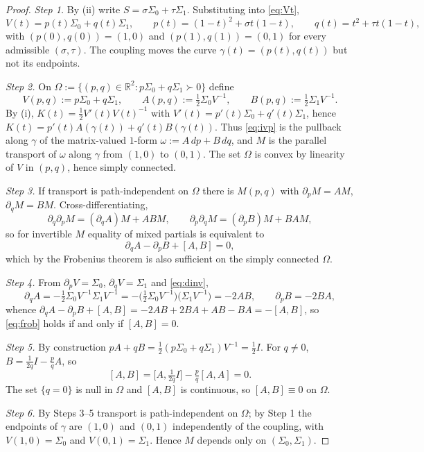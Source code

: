 \documentclass[11pt]{article}
\theoremstyle{definition}
\theoremstyle{remark}
\newcommand{\R}{\mathbb{R}}
\begin{document}
\begin{proof}
\emph{Step 1.} By (ii) write $S=\sigma\Sigma_0+\tau\Sigma_1$. Substituting into \eqref{eq:Vt},
\[
V(t)=p(t)\Sigma_0+q(t)\Sigma_1,
\qquad
p(t)=(1-t)^{2}+\sigma t(1-t),
\qquad
q(t)=t^{2}+\tau t(1-t),
\]
with $(p(0),q(0))=(1,0)$ and $(p(1),q(1))=(0,1)$ for every admissible $(\sigma,\tau)$. The coupling
moves the curve $\gamma(t)=(p(t),q(t))$ but not its endpoints.

\emph{Step 2.} On $\Omega:=\{(p,q)\in\R^{2}:p\Sigma_0+q\Sigma_1\succ0\}$ define
\[
V(p,q):=p\Sigma_0+q\Sigma_1,
\qquad
A(p,q):=\tfrac12\Sigma_0V^{-1},
\qquad
B(p,q):=\tfrac12\Sigma_1V^{-1}.
\]
By (i), $K(t)=\tfrac12V'(t)V(t)^{-1}$ with $V'(t)=p'(t)\Sigma_0+q'(t)\Sigma_1$, hence
$K(t)=p'(t)A(\gamma(t))+q'(t)B(\gamma(t))$. Thus \eqref{eq:ivp} is the pullback along $\gamma$ of
the matrix-valued $1$-form $\omega:=A\,dp+B\,dq$, and $M$ is the parallel transport of $\omega$
along $\gamma$ from $(1,0)$ to $(0,1)$. The set $\Omega$ is convex by linearity of $V$ in $(p,q)$,
hence simply connected.

\emph{Step 3.} If transport is path-independent on $\Omega$ there is $M(p,q)$ with
$\partial_pM=AM$, $\partial_qM=BM$. Cross-differentiating,
\[
\partial_q\partial_pM=(\partial_qA)M+ABM,
\qquad
\partial_p\partial_qM=(\partial_pB)M+BAM,
\]
so for invertible $M$ equality of mixed partials is equivalent to
\begin{equation}\label{eq:frob}
\partial_qA-\partial_pB+[A,B]=0,
\end{equation}
which by the Frobenius theorem is also sufficient on the simply connected $\Omega$.

\emph{Step 4.} From $\partial_pV=\Sigma_0$, $\partial_qV=\Sigma_1$ and \eqref{eq:dinv},
\[
\partial_qA=-\tfrac12\Sigma_0V^{-1}\Sigma_1V^{-1}=-\big(\tfrac12\Sigma_0V^{-1}\big)\big(\Sigma_1V^{-1}\big)=-2AB,
\qquad
\partial_pB=-2BA,
\]
whence $\partial_qA-\partial_pB+[A,B]=-2AB+2BA+AB-BA=-[A,B]$, so \eqref{eq:frob} holds if and only
if $[A,B]=0$.

\emph{Step 5.} By construction $pA+qB=\tfrac12(p\Sigma_0+q\Sigma_1)V^{-1}=\tfrac12I$. For $q\neq0$,
$B=\tfrac{1}{2q}I-\tfrac{p}{q}A$, so
\[
[A,B]=\Big[A,\tfrac{1}{2q}I\Big]-\tfrac{p}{q}[A,A]=0.
\]
The set $\{q=0\}$ is null in $\Omega$ and $[A,B]$ is continuous, so $[A,B]\equiv0$ on $\Omega$.

\emph{Step 6.} By Steps 3--5 transport is path-independent on $\Omega$; by Step 1 the endpoints of
$\gamma$ are $(1,0)$ and $(0,1)$ independently of the coupling, with $V(1,0)=\Sigma_0$ and
$V(0,1)=\Sigma_1$. Hence $M$ depends only on $(\Sigma_0,\Sigma_1)$.
\end{proof}
\end{document}
